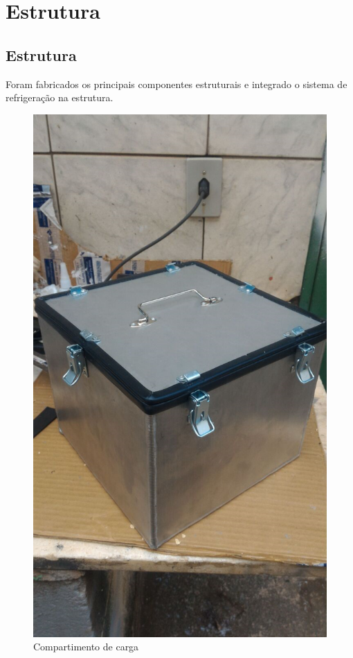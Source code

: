 \section{Estrutura}

\subsection{Estrutura}

Foram fabricados os principais componentes estruturais e integrado o sistema de refrigeração na estrutura.

\begin{figure}[H]
\centering
\includegraphics[width=16cm]{figuras/compartimentodecarga.png}
\caption{Compartimento de carga}
\end{figure}

